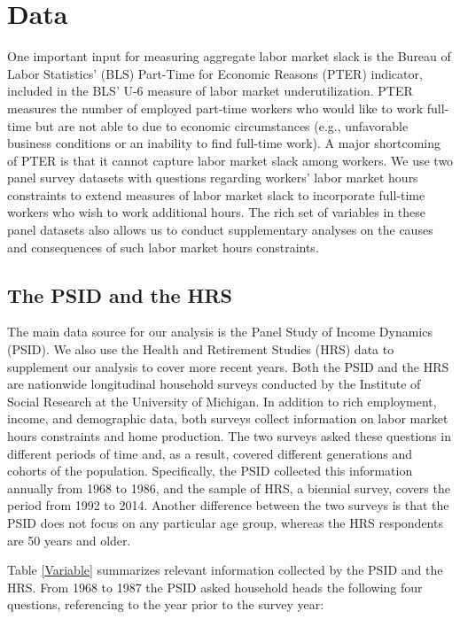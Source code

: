 \section{Data}

One important input for measuring aggregate labor market slack is the Bureau of Labor Statistics' (BLS) Part-Time for Economic Reasons (PTER) indicator, included in the BLS' U-6 measure of labor market underutilization. PTER measures the number of employed part-time workers who would like to work full-time but are not able to due to economic circumstances (e.g., unfavorable business conditions or an inability to find full-time work). A major shortcoming of PTER is that it cannot capture labor market slack among  workers. We use two panel survey datasets with questions regarding workers' labor market hours constraints to extend measures of labor market slack to incorporate full-time workers who wish to work additional hours. The rich set of variables in these panel datasets also allows us to conduct supplementary analyses on the causes and consequences of such labor market hours constraints.

\subsection{The PSID and the HRS}
The main data source for our analysis is the Panel Study of Income Dynamics (PSID). We also use the Health and Retirement Studies (HRS) data to supplement our analysis to cover more recent years. Both the PSID and the HRS are nationwide longitudinal household surveys conducted by the Institute of Social Research at the University of Michigan. In addition to rich employment, income, and demographic data, both surveys collect information on labor market hours constraints and home production. The two surveys asked these questions in different periods of time and, as a result, covered different generations and cohorts of the population. Specifically, the PSID collected this information annually from 1968 to 1986, and the sample of HRS, a biennial survey, covers the period from 1992 to 2014. Another difference between the two surveys is that the PSID does not focus on any particular age group, whereas the HRS respondents are 50 years and older.

Table \ref{Variable} summarizes relevant information collected by the PSID and the HRS. From 1968 to 1987 the PSID asked household heads the following four questions, referencing to the year prior to the survey year:

